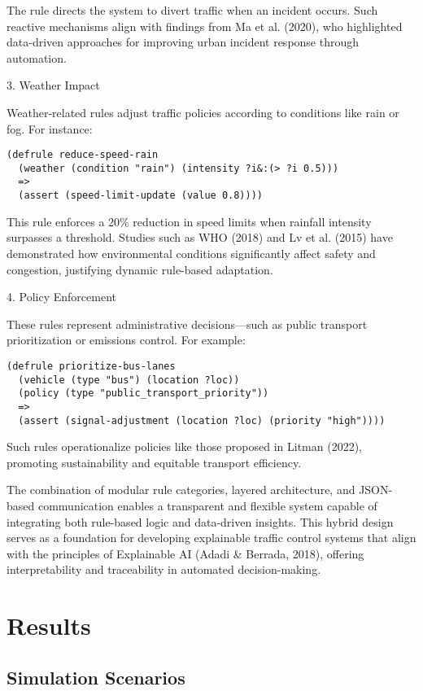\documentclass{article}
\begin{document}
The rule directs the system to divert traffic when an incident occurs. Such reactive mechanisms align with findings from Ma et al. (2020), who highlighted data-driven approaches for improving urban incident response through automation.

3. Weather Impact

Weather-related rules adjust traffic policies according to conditions like rain or fog. For instance:

\begin{verbatim}
(defrule reduce-speed-rain
  (weather (condition "rain") (intensity ?i&:(> ?i 0.5)))
  =>
  (assert (speed-limit-update (value 0.8))))
\end{verbatim}

This rule enforces a 20\% reduction in speed limits when rainfall intensity surpasses a threshold. Studies such as WHO (2018) and Lv et al. (2015) have demonstrated how environmental conditions significantly affect safety and congestion, justifying dynamic rule-based adaptation.

4. Policy Enforcement

These rules represent administrative decisions—such as public transport prioritization or emissions control. For example:

\begin{verbatim}
(defrule prioritize-bus-lanes
  (vehicle (type "bus") (location ?loc))
  (policy (type "public_transport_priority"))
  =>
  (assert (signal-adjustment (location ?loc) (priority "high"))))
\end{verbatim}

Such rules operationalize policies like those proposed in Litman (2022), promoting sustainability and equitable transport efficiency.

The combination of modular rule categories, layered architecture, and JSON-based communication enables a transparent and flexible system capable of integrating both rule-based logic and data-driven insights. This hybrid design serves as a foundation for developing explainable traffic control systems that align with the principles of Explainable AI (Adadi \& Berrada, 2018), offering interpretability and traceability in automated decision-making.

\section{Results}

\subsection{Simulation Scenarios}
\end{document}
